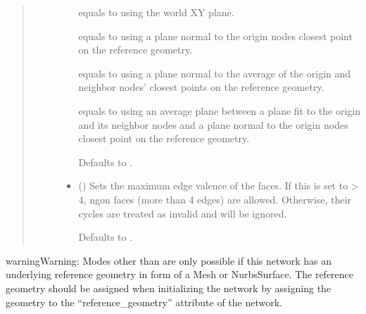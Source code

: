 \documentclass[letterpaper,10pt,english]{sphinxmanual}
\begin{document}
\begin{fulllineitems}
\begin{fulllineitems}
\begin{quote}
\begin{description}
\begin{itemize}
 equals to using the world XY plane.

 equals to using a plane normal to the origin nodes closest
point on the reference geometry.

 equals to using a plane normal to the average of the origin
and neighbor nodes’ closest points on the reference geometry.

 equals to using an average plane between a plane fit to the
origin and its neighbor nodes and a plane normal to the origin
nodes closest point on the reference geometry.

Defaults to .


\item {} 
 (\sphinxstyleliteralemphasis{\sphinxupquote{, }}) \textendash{} 
Sets the maximum edge valence of the faces. If this is set to \textgreater{} 4,
n\sphinxhyphen{}gon faces (more than 4 edges) are allowed. Otherwise, their
cycles are treated as invalid and will be ignored.

Defaults to .


\end{itemize}

\end{description}\end{quote}

\begin{sphinxadmonition}{warning}{Warning:}
Modes other than  are only possible if this network has an
underlying reference geometry in form of a Mesh or NurbsSurface. The
reference geometry should be assigned when initializing the network by
assigning the geometry to the “reference\_geometry” attribute of the
network.
\end{sphinxadmonition}

\end{fulllineitems}



\end{fulllineitems}
\end{document}
